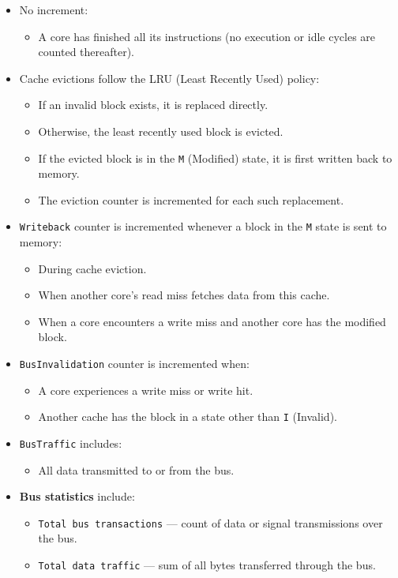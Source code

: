 \documentclass{article}
\begin{document}
\begin{itemize}
    \item No increment:
    \begin{itemize}
         \item A core has finished all its instructions (no execution or idle cycles are counted thereafter).
    \end{itemize}

    \item Cache evictions follow the LRU (Least Recently Used) policy:
    \begin{itemize}
        \item If an invalid block exists, it is replaced directly.
        \item Otherwise, the least recently used block is evicted.
        \item If the evicted block is in the \texttt{M} (Modified) state, it is first written back to memory.
        \item The eviction counter is incremented for each such replacement.
    \end{itemize}

    \item \texttt{Writeback} counter is incremented whenever a block in the \texttt{M} state is sent to memory:
    \begin{itemize}
        \item During cache eviction.
        \item When another core's read miss fetches data from this cache.
        \item When a core encounters a write miss and another core has the modified block.
    \end{itemize}

    \item \texttt{BusInvalidation} counter is incremented when:
    \begin{itemize}
        \item A core experiences a write miss or write hit.
        \item Another cache has the block in a state other than \texttt{I} (Invalid).
    \end{itemize}

    \item \texttt{BusTraffic} includes:
    \begin{itemize}
        \item All data transmitted to or from the bus.
    \end{itemize}

    \item \textbf{Bus statistics} include:
    \begin{itemize}
        \item \texttt{Total bus transactions} — count of data or signal transmissions over the bus.
        \item \texttt{Total data traffic} — sum of all bytes transferred through the bus.
    \end{itemize}
\end{itemize}
\end{document}
